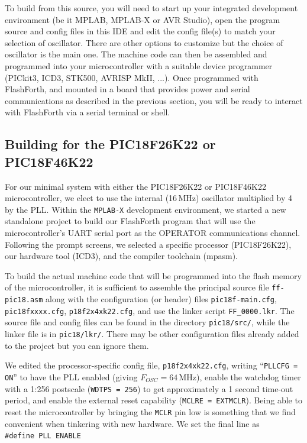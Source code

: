 \documentclass[12pt,a4paper]{article}
\begin{document}
\medskip\noindent
To build from this source, you will need to start up your integrated development environment 
(be it MPLAB, MPLAB-X or AVR Studio), open the program source and config files in this IDE 
and edit the config file(s) to match your selection of oscillator.
There are other options to customize but the choice of oscillator is the main one.
The machine code can then be assembled and programmed into your microcontroller with 
a suitable device programmer (PICkit3, ICD3, STK500, AVRISP MkII, ...).
Once programmed with FlashForth, and mounted in a board that provides power and serial
communications as described in the previous section, you will be ready to interact with
FlashForth via a serial terminal or shell.


\medskip
\subsection{Building for the PIC18F26K22 or PIC18F46K22}
%
For our minimal system with either the PIC18F26K22 or PIC18F46K22 microcontroller,
we elect to use the internal (16\,MHz) oscillator multiplied by 4 by the PLL.
Within the \verb!MPLAB-X! development environment, 
we started a new standalone project to build our FlashForth program
that will use the microcontroller's UART serial port as the OPERATOR communications channel.
Following the prompt screens, we selected a specific processor (PIC18F26K22), 
our hardware tool (ICD3), and the compiler toolchain (mpasm).

\medskip\noindent
To build the actual machine code that will be programmed into the flash memory
of the microcontroller,
it is sufficient to assemble the principal source file \verb!ff-pic18.asm!
along with the configuration (or header) files \verb!pic18f-main.cfg!, \verb!pic18fxxxx.cfg!, \verb!p18f2x4xk22.cfg!,
and use the linker script \verb!FF_0000.lkr!.
The source file and config files can be found in the directory \verb!pic18/src/!,
while the linker file is in \verb!pic18/lkr/!.
There may be other configuration files already added to the project but you can ignore them.

\medskip\noindent
We edited the processor-specific config file, \verb!p18f2x4xk22.cfg!, writing ``\verb!PLLCFG = ON!'' 
to have the PLL enabled (giving $F_{OSC} = 64$\,MHz),
enable the watchdog timer with a 1:256 postscale (\verb!WDTPS = 256!) 
to get approximately a 1 second time-out period,
and enable the external reset capability (\verb!MCLRE = EXTMCLR!).
Being able to reset the microcontroller by bringing the \verb!MCLR! pin low is something that
we find convenient when tinkering with new hardware.
We set the final line as \\
\verb!#define PLL ENABLE!
\end{document}
